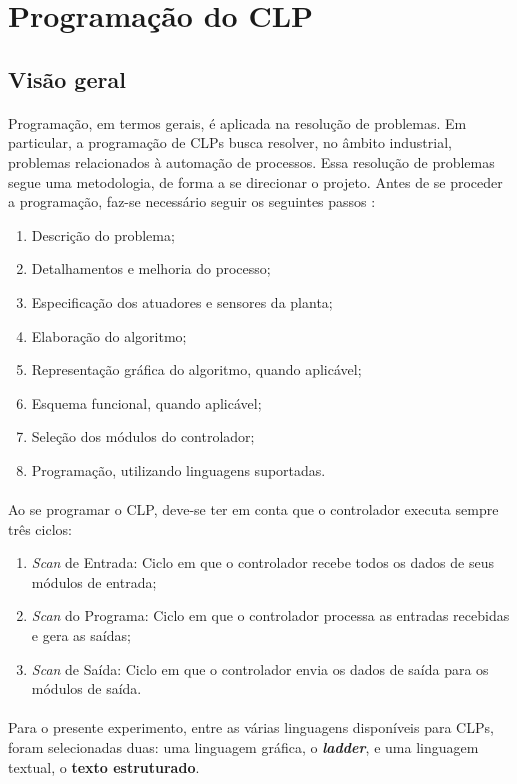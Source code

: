 \section{Programação do CLP}
\subsection{Visão geral}
\paragraph{}Programação, em termos gerais, é aplicada na resolução de problemas. Em particular, a programação de CLPs busca resolver, no âmbito industrial, problemas relacionados à automação de processos. Essa resolução de problemas segue uma metodologia, de forma a se direcionar o projeto. Antes de se proceder a programação, faz-se necessário seguir os seguintes passos \cite{rockwellAutomation}:
\begin{enumerate}
  \item Descrição do problema;
  \item Detalhamentos e melhoria do processo;
  \item Especificação dos atuadores e sensores da planta;
  \item Elaboração do algoritmo;
  \item Representação gráfica do algoritmo, quando aplicável;
  \item Esquema funcional, quando aplicável;
  \item Seleção dos módulos do controlador;
  \item Programação, utilizando linguagens suportadas.
\end{enumerate}
\paragraph{}Ao se programar o CLP, deve-se ter em conta que o controlador executa sempre três ciclos:
\begin{enumerate}
  \item \textit{Scan} de Entrada: Ciclo em que o controlador recebe todos os dados de seus módulos de entrada;
  \item \textit{Scan} do Programa: Ciclo em que o controlador processa as entradas recebidas e gera as saídas;
  \item \textit{Scan} de Saída: Ciclo em que o controlador envia os dados de saída para os módulos de saída.
\end{enumerate}
\paragraph{}Para o presente experimento, entre as várias linguagens disponíveis para CLPs, foram selecionadas duas: uma linguagem gráfica, o \textbf{\textit{ladder}}, e uma linguagem textual, o \textbf{texto estruturado}.

